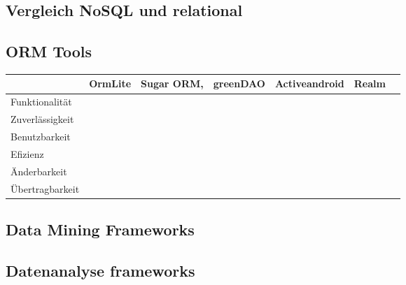 	\subsection{Vergleich NoSQL und relational}

	\subsection{ORM Tools}
		\begin{tabular} {| l | c | c | c | c | c | c |}
			\hline
			& OrmLite & Sugar ORM, & greenDAO & Activeandroid & Realm 		\\ \hline \hline
			Funktionalität &  &	 &  &  &  &  	\\ \hline
			Zuverlässigkeit &  &	 &  &  &  & 	 			\\ \hline
			Benutzbarkeit &  &	 &  &  &  &  	 		\\ \hline
			Efizienz &  &	 &  &  &  &  			\\ \hline
			Änderbarkeit &  &  &  &  &  &  		\\ \hline 
			Übertragbarkeit	&  &	&  &  &  &  					\\ \hline
		\end{tabular}


	\subsection{Data Mining Frameworks}

	\subsection{Datenanalyse frameworks}

